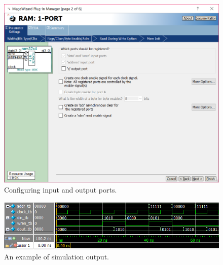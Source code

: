 \documentclass[epsfig,10pt,fullpage]{article}
\begin{document}
\begin{figure}[H]
	\begin{center}
		\includegraphics[scale=0.42]{figures/figure3.png}
	\end{center}
	\caption{Configuring input and output ports.}
	\label{fig:fig3}
\end{figure}

\begin{figure}[H]
	\begin{center}
		\includegraphics[scale=0.8]{figures/simulation.png}
	\end{center}
	\caption{An example of simulation output.}
	\label{fig:figsim}
\end{figure}
\end{document}
